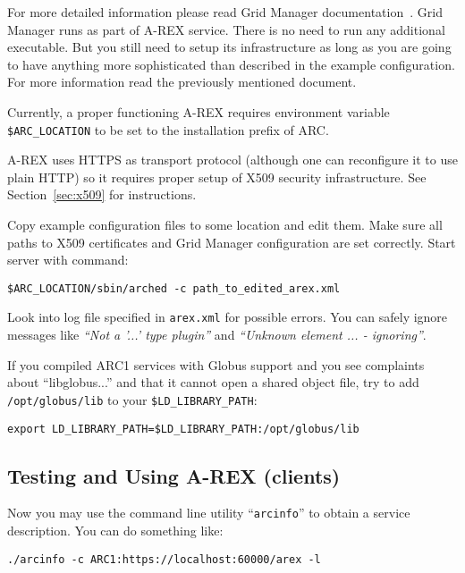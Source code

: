 \documentclass{article}                            %
\begin{document}
For more detailed information please read Grid Manager
documentation~\cite{arex}. Grid Manager runs as part of A-REX service. There is
no need to run any additional executable. But you still need to setup its
infrastructure as long as you are going to have anything more sophisticated than
described in the example configuration. For more information read the previously
mentioned document.

Currently, a proper functioning A-REX requires environment variable
\verb|$ARC_LOCATION| to be set to the installation prefix of ARC.

A-REX uses HTTPS as transport protocol (although one can reconfigure it to use
plain HTTP) so it requires proper setup of X509 security infrastructure. See
Section~\ref{sec:x509} for instructions.

Copy example configuration files to some location and edit them. Make sure all
paths to X509 certificates and Grid Manager configuration are set correctly.
Start server with command:

\begin{lstlisting}
$ARC_LOCATION/sbin/arched -c path_to_edited_arex.xml
\end{lstlisting}

Look into log file specified in \texttt{arex.xml} for possible errors. You can
safely ignore messages like \textit{``Not a '...' type plugin''} and
\textit{``Unknown element ... - ignoring''}.

If you compiled ARC1 services with Globus support and you see complaints about
``libglobus...'' and that it cannot open a shared object file, try to add
\texttt{/opt/globus/lib} to your \verb|$LD_LIBRARY_PATH|:

\begin{lstlisting}
export LD_LIBRARY_PATH=$LD_LIBRARY_PATH:/opt/globus/lib
\end{lstlisting}

\subsection{Testing and Using A-REX (clients)}
\label{sec:testing}

Now you may use the command line utility ``\texttt{arcinfo}'' to obtain a service
description. You can do something like:

\begin{lstlisting}
./arcinfo -c ARC1:https://localhost:60000/arex -l
\end{lstlisting}
\end{document}

